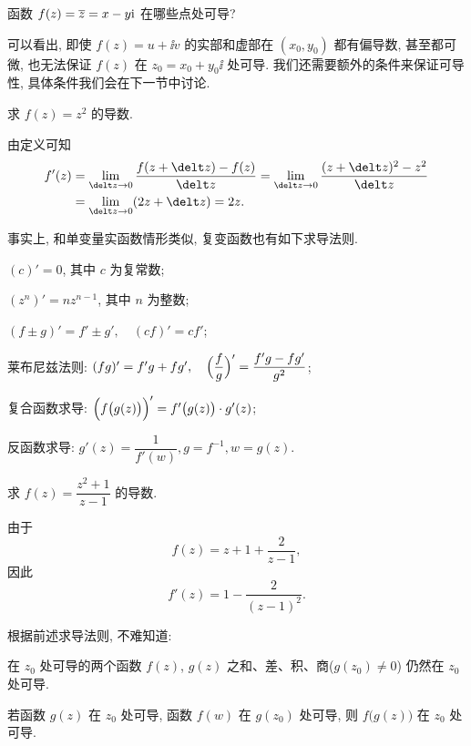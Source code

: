 \begin{exercise}
  函数 $f(z)=\overline z=x-y\mathrm{i}$ 在哪些点处可导? 
\end{exercise}

可以看出, 即使 $f(z)=u+\ii v$ 的实部和虚部在 $(x_0,y_0)$ 都有偏导数, 甚至都可微, 也无法保证 $f(z)$ 在 $z_0=x_0+y_0\ii$ 处可导.
我们还需要额外的条件来保证可导性, 具体条件我们会在下一节中讨论.

\begin{example}
  求 $f(z)=z^2$ 的导数.
\end{example}

\begin{solution}
  由定义可知
  \begin{align*}
     f'(z)&
    =\lim_{\delt z\ra 0}\frac{f(z+\delt z)-f(z)}{\delt z}
    =\lim_{\delt z\ra 0}\frac{(z+\delt z)^2-z^2}{\delt z}\\&
    =\lim_{\delt z\ra 0}(2z+\delt z)=2z.
  \end{align*}
\end{solution}

事实上, 和单变量实函数情形类似, 复变函数也有如下求导法则.
\begin{theorem}
  \begin{enuma}
    \item $(c)'=0$, 其中 $c$ 为复常数;
    \item $(z^n)'=nz^{n-1}$, 其中 $n$ 为整数;
    \item $(f\pm g)'=f'\pm g',\quad (cf)'=cf'$;
    \item 莱布尼兹法则: $(fg)'=f'g+fg',\quad \Bigl(\dfrac fg\Bigr)'=\dfrac{f'g-fg'}{g^2}$;
    \item 复合函数求导: $\Bigl(f\bigl(g(z)\bigr)\Bigr)'=f'\bigl(g(z)\bigr)\cdot g'(z)$;
    \item 反函数求导: $g'(z)=\dfrac1{f'(w)}, g=f^{-1}, w=g(z)$.
    \label{item:inverse-function-derivative}
  \end{enuma}
\end{theorem}

\begin{example}
  求 $f(z)=\dfrac{z^2+1}{z-1}$ 的导数.
\end{example}
\begin{solution}
  由于
  \[
    f(z)=z+1+\frac2{z-1},
  \]
  因此
  \[
    f'(z)=1-\frac2{(z-1)^2}.
  \]
\end{solution}

根据前述求导法则, 不难知道:

\begin{theorem}
  \label{thm:four-derivable}
  \begin{enuma}
    \item 在 $z_0$ 处可导的两个函数 $f(z)$, $g(z)$ 之和、差、积、商($g(z_0)\neq 0$) 仍然在 $z_0$ 处可导.
    \item 若函数 $g(z)$ 在 $z_0$ 处可导, 函数 $f(w)$ 在 $g(z_0)$ 处可导, 则 $f\bigl(g(z)\bigr)$ 在 $z_0$ 处可导.
  \end{enuma}
\end{theorem}

